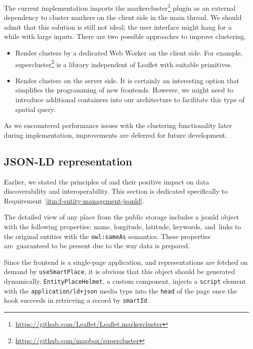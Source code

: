 The current implementation imports the markercluster\footnote{\href{https://github.com/Leaflet/Leaflet.markercluster}{https://github.com/Leaflet/Leaflet.markercluster}} plugin as an external dependency to cluster markers on the client side in the main thread. We should admit that this solution is still not ideal; the user interface might hang for a while with large inputs. There are two possible approaches to improve clustering.

\begin{itemize}
\item Render clusters by a dedicated Web Worker on the client side. For example, supercluster\footnote{\href{https://github.com/mapbox/supercluster}{https://github.com/mapbox/supercluster}} is a library independent of Leaflet with suitable primitives.
\item Render clusters on the server side. It is certainly an interesting option that simplifies the programming of new frontends. However, we might need to introduce additional containers into our architecture to facilitate this type of spatial query.
\end{itemize}

As we encountered performance issues with the clustering functionality later during implementation, improvements are deferred for future development.

\subsection{JSON-LD representation}\label{ssec:jsonld-representation}

Earlier, we stated the principles of \emph{} and their positive impact on data discoverability and interoperability. This section is dedicated specifically to Requirement~\ref{itm:f-entity-management-jsonld}.

The detailed view of any place from the public storage includes a \acs{jsonld} object with the following properties: name, longitude, latitude, keywords, and~links to the original entities with the \texttt{owl:sameAs} semantics. These properties are~guar\-an\-teed to be present due to the way data is prepared.

Since the frontend is a single-page application, and representations are fetched on demand by \texttt{useSmartPlace}, it is obvious that this object should be generated dynamically. \texttt{EntityPlaceHelmet}, a custom component, injects a \texttt{script} element with the \texttt{application/ld+json} media type into the \texttt{head} of the page once the hook succeeds in retrieving a record by \texttt{smartId}.

